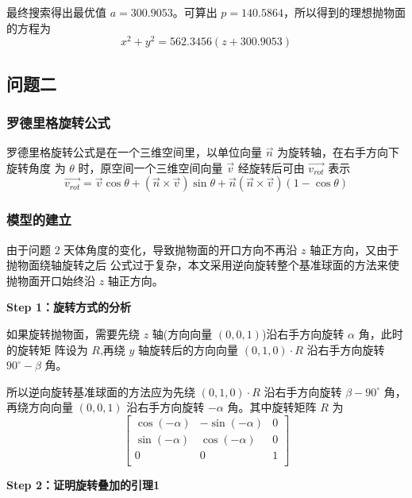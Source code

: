 \documentclass[withoutpreface,bwprint]{cumcmthesis} %
\begin{document}
最终搜索得出最优值 $a = 300.9053$。可算出 $p = 140.5864$，所以得到的理想抛物面的方程为
\[
    x^2 + y^2 = 562.3456(z + 300.9053)
\]
\subsection{问题二}
\subsubsection{罗德里格旋转公式}
罗德里格旋转公式是在一个三维空间里，以单位向量 $\overrightarrow{n}$ 为旋转轴，在右手方向下旋转角度
为 $\theta$ 时，原空间一个三维空间向量 $\overrightarrow{v}$ 经旋转后可由 $\overrightarrow{v_{rot}}$
表示
\[
    \overrightarrow{v_{rot}} = \overrightarrow{v}\cos\theta + (\overrightarrow{n}
    \times \overrightarrow{v})\sin\theta + \overrightarrow{n}(\overrightarrow{n}
    \times \overrightarrow{v})(1 - \cos\theta) 
\]
\subsubsection{模型的建立}
由于问题 $2$ 天体角度的变化，导致抛物面的开口方向不再沿 $z$ 轴正方向，又由于抛物面绕轴旋转之后
公式过于复杂，本文采用逆向旋转整个基准球面的方法来使抛物面开口始终沿 $z$ 轴正方向。

\textbf{Step 1：旋转方式的分析}

如果旋转抛物面，需要先绕 $z$ 轴(方向向量 $(0,0,1)$)沿右手方向旋转 $\alpha$ 角，此时的旋转矩
阵设为 $R$,再绕 $y$ 轴旋转后的方向向量 $(0,1,0)\cdot R$ 沿右手方向旋转 $90^\circ-\beta$
角。

所以逆向旋转基准球面的方法应为先绕 $(0,1,0)\cdot R$ 沿右手方向旋转 $\beta-90^\circ$ 角，
再绕方向向量 $(0,0,1)$ 沿右手方向旋转 $-\alpha$ 角。其中旋转矩阵 $R$ 为
\[
    \begin{bmatrix}
        \cos(-\alpha) & -\sin(-\alpha) & 0 \\
        \sin(-\alpha) & \cos(-\alpha)  & 0 \\
        0  &  0  & 1 \\
    \end{bmatrix}
\]

\textbf{Step 2：证明旋转叠加的引理1}
\end{document}
